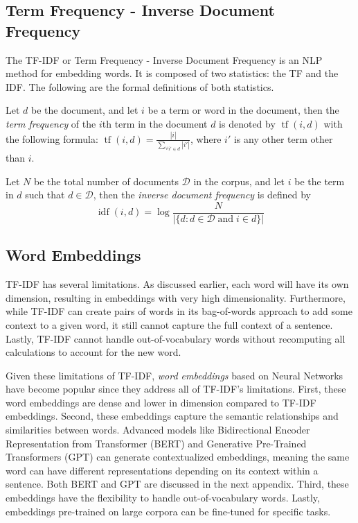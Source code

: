 \subsection{Term Frequency - Inverse Document Frequency}\label{sec:tf-df}
The TF-IDF or Term Frequency - Inverse Document Frequency is an NLP method for embedding words. It is composed of two statistics: the TF and the IDF. The following are the formal definitions of both statistics.

\begin{defnx}
Let $d$ be the document, and let $i$ be a term or word in the document, then the \textit{term frequency} of the $i$th term in the document $d$ is denoted by $\operatorname{tf}(i,d)$ with the following formula: $\operatorname{tf}(i,d)=\displaystyle\frac{|i|}{\sum_{\forall i'\in d}|i'|}$, where $i'$ is any other term other than $i$.
\end{defnx}

\begin{defnx}
Let $N$ be the total number of documents $\mathscr{D}$ in the corpus, and let $i$ be the term in $d$ such that $d\in \mathscr{D}$, then the \textit{inverse document frequency} is defined by
\begin{equation}
    \operatorname{idf}(i,d)=\log\frac{N}{|\{d:d\in \mathscr{D}\;\text{and}\;i\in d\}|}
\end{equation}
\end{defnx}

\subsection{Word Embeddings}\label{sec:word-embeddings}
TF-IDF has several limitations. As discussed earlier, each word will have its own dimension, resulting in embeddings with very high dimensionality. Furthermore, while TF-IDF can create pairs of words in its bag-of-words approach to add some context to a given word, it still cannot capture the full context of a sentence. Lastly, TF-IDF cannot handle out-of-vocabulary words without recomputing all calculations to account for the new word.

Given these limitations of TF-IDF, \textit{word embeddings} based on Neural Networks have become popular since they address all of TF-IDF's limitations. First, these word embeddings are dense and lower in dimension compared to TF-IDF embeddings. Second, these embeddings capture the semantic relationships and similarities between words. Advanced models like Bidirectional Encoder Representation from Transformer (BERT) and Generative Pre-Trained Transformers (GPT) can generate contextualized embeddings, meaning the same word can have different representations depending on its context within a sentence. Both BERT and GPT are discussed in the next appendix. Third, these embeddings have the flexibility to handle out-of-vocabulary words. Lastly, embeddings pre-trained on large corpora can be fine-tuned for specific tasks.

